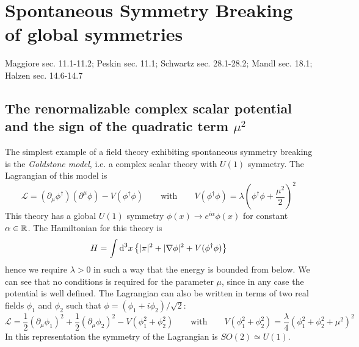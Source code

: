 \documentclass[TheoreticalPhy_ModB.tex]{subfiles}
\begin{document}
\section{Spontaneous Symmetry Breaking of global symmetries}
\textsf{Maggiore sec. 11.1-11.2; Peskin sec. 11.1; Schwartz sec. 28.1-28.2; Mandl sec. 18.1; Halzen sec. 14.6-14.7}\\

\subsection{The renormalizable complex scalar potential and the sign of the quadratic term $\mu^2$}

The simplest example of a field theory exhibiting spontaneous symmetry breaking is the \emph{Goldstone model}, i.e. a complex scalar theory with $U(1)$ symmetry. The Lagrangian of this model is
\[\mathcal L=(\partial_\mu\phi^\dagger)(\partial^\mu\phi)-V(\phi^\dagger\phi)
\qquad \text{with}\qquad
V(\phi^\dagger\phi)=\lambda\left(\phi^\dagger\phi+\frac{\mu^2}2\right)^2
\]
This theory has a global $U(1)$ symmetry $\phi(x)\to e^{i\alpha}\phi(x)$ for constant $\alpha\in\mathbb{R}$. The Hamiltonian for this theory is
\[H=\int\textup{d}^3x\left\{|\pi|^2+|\mathbf\nabla\phi|^2+V(\phi^\dagger\phi)\right\}\]
hence we require $\lambda>0$ in such a way that the energy is bounded from below. We can see that no conditions is required for the parameter $\mu$, since in any case the potential is well defined. The Lagrangian can also be written in terms of two real fields $\phi_1$ and $\phi_2$ such that $\phi=(\phi_1+i\phi_2)/{\sqrt2}$:
\[\mathcal L=\frac12(\partial_\mu\phi_1)^2+\frac12(\partial_\mu\phi_2)^2-V(\phi_1^2+\phi_2^2)
\qquad \text{with}\qquad
V(\phi_1^2+\phi_2^2)=\frac\lambda4\left(\phi_1^2+\phi_2^2+\mu^2\right)^2
\]
In this representation the symmetry of the Lagrangian is $SO(2)\simeq U(1)$.
\end{document}
